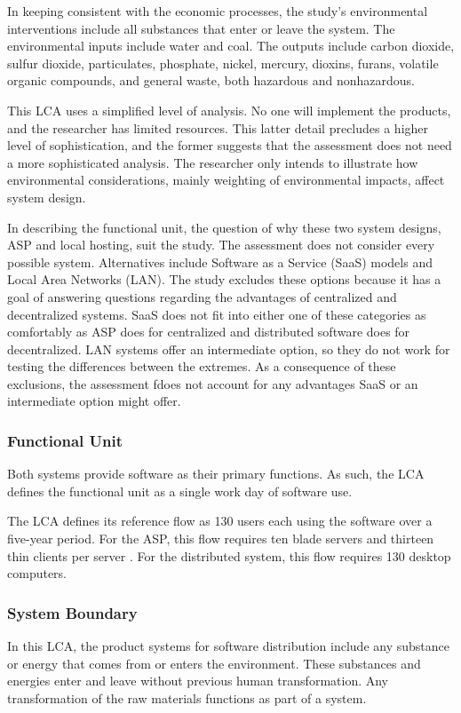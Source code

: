 \documentclass[final,journal,10pt,letterpaper,oneside,twocolumn,compsoc]%
{IEEEtran}
\begin{document}
In keeping consistent with the economic processes, the study's environmental
interventions
include all substances that enter or leave the system. The environmental inputs
include water and coal. The outputs include carbon dioxide, sulfur dioxide,
particulates, phosphate, nickel, mercury, dioxins, furans, volatile organic
compounds, and general waste, both hazardous and nonhazardous.

This LCA uses a simplified level of analysis. No one will implement the
products, and the researcher has limited resources. This latter detail precludes
a higher level of sophistication, and the former suggests that the
assessment does not need a more sophisticated analysis. The researcher only
intends to illustrate how environmental considerations, mainly weighting of
environmental impacts, affect system design.

In describing the functional unit, the question of why these two system designs,
ASP and local hosting, suit the study. The assessment does not consider
every possible system. Alternatives include
Software as a Service (SaaS) models and Local Area Networks (LAN). The study
excludes
these options because it has a goal of answering questions regarding the
advantages of
centralized and decentralized systems. SaaS does not fit into either one of
these categories as comfortably as ASP does for centralized and distributed
software does for decentralized. LAN systems offer an intermediate option, so
they do not work for testing the differences between the extremes. As a
consequence
of these exclusions, the assessment fdoes not account for any advantages SaaS or
an intermediate option might offer.

\subsubsection{Functional Unit}
Both systems provide software as their primary functions.  As such, the LCA
defines the functional unit as a single work day of software use.

The LCA defines its reference flow as 130 users each using
the software over a five-year period. For the ASP,
this flow requires ten blade servers and thirteen thin clients per server
\cite{client}.
For the distributed system, this flow requires 130 desktop computers.

\subsubsection{System Boundary}
In this LCA, the product systems for software distribution
include any substance or energy that comes from or enters the
environment. These substances and energies enter and leave without previous
human transformation. Any transformation of the raw materials functions as part
of a system.
\end{document}
